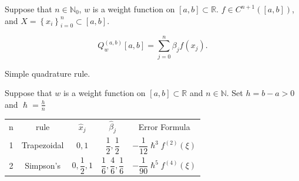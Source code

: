 \begin{frame}
    \begin{theorem}
        Suppose that $n\in\mathbb{N}_{0}$, $w$ is a weight function
        on
        \begin{math}
            \left[a,b\right]\subset
            \mathbb{R}
        \end{math}.
        \begin{math}
            f\in C^{n+1}
            \left(
            \left[a,b\right]
            \right)
        \end{math},
        and
        \begin{math}
            X=
            \left\{x_{i}\right\}_{i=0}^{n}\subset
            \left[a,b\right]
        \end{math}.
    \end{theorem}

    \begin{equation*}
        Q^{\left(a,b\right)}_{w}
        \left[a,b\right]=
        \sum_{j=0}^{n}
        \beta_{j}
        f\left(x_{j}\right).
    \end{equation*}

    Simple quadrature rule.

    \begin{definition}
        Suppose that $w$ is a weight function on
        \begin{math}
            \left[a,b\right]\subset
            \mathbb{R}
        \end{math}
        and $n\in\mathbb{N}$.
        Set $h=b-a>0$ and $\hslash=\frac{h}{n}$
    \end{definition}

    \begin{table}[ht!]
        \centering
        \begin{tabular}{ccccc}
            n & rule                                                          & $\widehat{x}_{j}$  & $\widehat{\beta}_{j}$
              & Error Formula                                                                                                                   \\
            1 & Trapezoidal                                                   & $0,1$              & $\dfrac{1}{2}, \dfrac{1}{2}$
              & $-\dfrac{1}{12}\hslash^{3}f^{\left(2\right)}\left(\xi\right)$                                                                   \\
            2 & Simpson's                                                     & $0,\dfrac{1}{2},1$ & $\dfrac{1}{6}, \dfrac{4}{6}, \dfrac{1}{6}$
              & $-\dfrac{1}{90}\hslash^{5}f^{\left(4\right)}\left(\xi\right)$
        \end{tabular}
    \end{table}


\end{frame}
